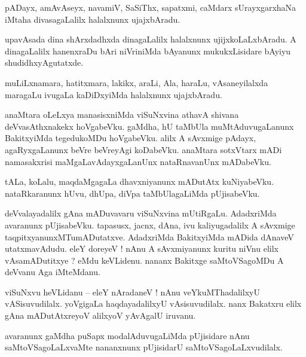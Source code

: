 \documentclass{article}
\begin{document}
\begin{mn}%
pADayx, amAvAseyx, navamiV, SaSiThx, sapatxmi, caMdarx sUrayxgarxhaNa iMtaha divasagaLalilx 
halalxnunx ujajxbAradu.
\end{mn}

\begin{mn}%
upavAsada dina shArxdadhxda dinagaLalilx halalxnunx ujijxkoLaLxbAradu. A dinagaLalilx hanenxraDu 
bAri niVriniMda bAyanunx mukukxLisidare bAyiyu shudidhxyAgutatxde.
\end{mn}

\begin{mn}%
muLiLxnamara, hatitxmara, lakikx, araLi, Ala, haraLu, vAsaneyilalxda maragaLu ivugaLa kaDiDxyiMda 
halalxnunx ujajxbAradu.
\end{mn}

\begin{mn}%
anaMtara oLeLxya manasisxniMda viSuNxvina athavA shivana deVvasAthxnakekx hoVgabeVku. gaMdha, hU 
taMbUla muMtAduvugaLanunx BakitxyiMda tegedukoMDu hoVgabeVku. alilx A sAvxmige pAdayx, 
agaRyxgaLanunx beVre beVreyAgi koDabeVku. anaMtara sotxVtarx mADi namasakxrisi 
maMgaLavAdayxgaLanUnx nataRnavanUnx mADabeVku.
\end{mn}

\begin{mn}%
tALa, koLalu, maqdaMgagaLa dhavxniyanunx mADutAtx kuNiyabeVku. nataRkaranunx hUvu, dhUpa, diVpa 
taMbUlagaLiMda pUjisabeVku.
\end{mn}

\begin{mn}%
deVvalayadalilx gAna mADuvavaru viSuNxvina mUtiRgaLu. AdadxriMda avaranunx pUjisabeVku. tapasusx, 
jacnx, dAna, ivu kaliyugadalilx A sAvxmige taqpitxyanunxMTumADutatxve. AdadxriMda BakitxyiMda 
mADida dAnaveV utatxmavAdudu. eleY doreyeV ! nAnu A sAvxmiyanunx kuritu niVnu elilx vAsamADutitxye 
? eMdu keVLidenu. nananx Bakitxge saMtoVSagoMDu A deVvanu Aga iMteMdanu.
\end{mn}

\begin{mn}%
viSuNxvu heVLidanu -- eleY nAradaneV ! nAnu veYkuMThadalilxyU vASisuvudilalx. yoVgigaLa 
haqdayadalilxyU vAsisuvudilalx. nanx Bakatxru elilx gAna mADutAtxreyoV alilxyoV yAvAgalU iruvanu.
\end{mn}

\begin{mn}%
avaranunx gaMdha puSapx modalAduvugaLiMda pUjisidare nAnu saMtoVSagoLaLxvaMte nananxnunx pUjisidarU 
saMtoVSagoLaLxvudilalx.
\end{mn}
\end{document}
